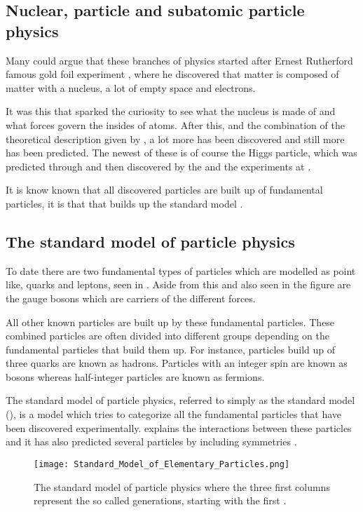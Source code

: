 \subsection{Nuclear, particle and subatomic particle physics}\label{sec:tb:subsec:nps}
Many could argue that these branches of physics started after Ernest Rutherford famous gold foil experiment \citep{Burchan:1995}, where he discovered that matter is composed of matter with a nucleus, a lot of empty space and electrons. 

It was this that sparked the curiosity to see what the nucleus is made of and what forces govern the insides of atoms. After this, and the combination of the theoretical description given by \abbrQM, a lot more has been discovered and still more has been predicted. The newest of these is of course the Higgs particle, which was predicted through \abbrQFT and then discovered by the \abbrATLAS and the \abbrCMS experiments at \abbrCERN \citep{Higgs:2012, Chatrchyan:2012}. 

It is know known that all discovered particles are built up of fundamental particles, it is that that builds up the standard model \citep{Burchan:1995}.
\subsection{The standard model of particle physics}\label{sec:tb:subsec:SM}
To date there are two fundamental types of particles which are modelled as point like, quarks and leptons, seen in . Aside from this and also seen in the figure are the gauge bosons which are carriers of the different forces.

All other known particles are built up by these fundamental particles. These combined particles are often divided into different groups depending on the fundamental particles that build them up. For instance, particles build up of three quarks are known as hadrons. Particles with an integer spin are known as bosons whereas half-integer particles are known as fermions.

The standard model of particle physics, referred to simply as the standard model (\abbrSM), is a model which tries to categorize all the fundamental particles that have been discovered experimentally. \abbrQFT explains the interactions between these particles and it has also predicted several particles by including symmetries \citep{Burchan:1995}.
\begin{figure}[h]
 \centering
\texttt{[image: Standard\_Model\_of\_Elementary\_Particles.png]}
  \caption{{\small The standard model of particle physics where the three first columns represent the so called generations, starting with the first \citep{wiki1}.}}
    \label{fig:SM}
\end{figure}

